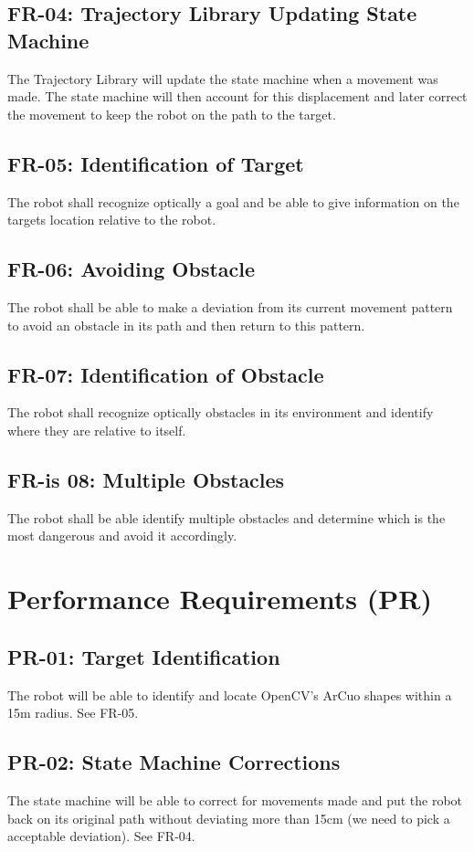 \documentclass[]{report}
\begin{document}
\subsection{FR-04: Trajectory Library Updating State Machine}
The Trajectory Library will update the state machine when a movement was made. The state machine will then account for this displacement and later correct the movement to keep the robot on the path to the target. 

\subsection{FR-05: Identification of Target}
The robot shall recognize optically a goal and be able to give information on the targets location relative to the robot. 

\subsection{FR-06: Avoiding Obstacle}
The robot shall be able to make a deviation from its current movement pattern to avoid an obstacle in its path and then return to this pattern.

\subsection{FR-07: Identification of Obstacle}
The robot shall recognize optically obstacles in its environment and identify where they are relative to itself.

\subsection{FR-is 08: Multiple Obstacles}
The robot shall be able identify multiple obstacles and determine which is the most dangerous and avoid it accordingly. 


\section{Performance Requirements (PR)}

\subsection{PR-01: Target Identification}
The robot will be able to identify and locate OpenCV's ArCuo shapes within a 15m radius. See FR-05.

\subsection{PR-02: State Machine Corrections}
The state machine will be able to correct for movements made and put the robot back on its original path without deviating more than 15cm (we need to pick a acceptable deviation). See FR-04.
\end{document}
